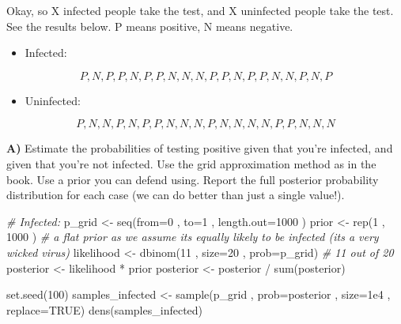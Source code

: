 \documentclass[
]{article}
\newenvironment{Shaded}{\begin{snugshade}}{\end{snugshade}}
\newcommand{\AttributeTok}[1]{\textcolor[rgb]{0.77,0.63,0.00}{#1}}
\newcommand{\CommentTok}[1]{\textcolor[rgb]{0.56,0.35,0.01}{\textit{#1}}}
\newcommand{\ConstantTok}[1]{\textcolor[rgb]{0.00,0.00,0.00}{#1}}
\newcommand{\DecValTok}[1]{\textcolor[rgb]{0.00,0.00,0.81}{#1}}
\newcommand{\FloatTok}[1]{\textcolor[rgb]{0.00,0.00,0.81}{#1}}
\newcommand{\FunctionTok}[1]{\textcolor[rgb]{0.00,0.00,0.00}{#1}}
\newcommand{\NormalTok}[1]{#1}
\newcommand{\OtherTok}[1]{\textcolor[rgb]{0.56,0.35,0.01}{#1}}
\newcommand{\SpecialCharTok}[1]{\textcolor[rgb]{0.00,0.00,0.00}{#1}}
\providecommand{\tightlist}{%
  \setlength{\itemsep}{0pt}\setlength{\parskip}{0pt}}
\begin{document}
Okay, so X infected people take the test, and X uninfected people take
the test. See the results below. P means positive, N means negative.

\begin{itemize}
\tightlist
\item
  Infected:
\end{itemize}

\[P, N, P, P, N, P, P, N, N, N, P, P, N, P, P, N, N, P, N, P\]

\begin{itemize}
\tightlist
\item
  Uninfected:
\end{itemize}

\[P, N, N, P, N, P, P, N, N, N, P, N, N, N, N, P, P, N, N, N\]

\textbf{A)} Estimate the probabilities of testing positive given that
you're infected, and given that you're not infected. Use the grid
approximation method as in the book. Use a prior you can defend using.
Report the full posterior probability distribution for each case (we can
do better than just a single value!).

\begin{Shaded}
\begin{Highlighting}[]
\CommentTok{\# Infected:}
\NormalTok{p\_grid }\OtherTok{\textless{}{-}} \FunctionTok{seq}\NormalTok{(}\AttributeTok{from=}\DecValTok{0}\NormalTok{ , }\AttributeTok{to=}\DecValTok{1}\NormalTok{ , }\AttributeTok{length.out=}\DecValTok{1000}\NormalTok{ )}
\NormalTok{prior }\OtherTok{\textless{}{-}} \FunctionTok{rep}\NormalTok{(}\DecValTok{1}\NormalTok{ , }\DecValTok{1000}\NormalTok{ ) }\CommentTok{\# a flat prior as we assume it\textquotesingle{}s equally likely to be infected (it\textquotesingle{}s a very wicked virus)}
\NormalTok{likelihood }\OtherTok{\textless{}{-}} \FunctionTok{dbinom}\NormalTok{(}\DecValTok{11}\NormalTok{ , }\AttributeTok{size=}\DecValTok{20}\NormalTok{ , }\AttributeTok{prob=}\NormalTok{p\_grid) }\CommentTok{\# 11 out of 20}
\NormalTok{posterior }\OtherTok{\textless{}{-}}\NormalTok{ likelihood }\SpecialCharTok{*}\NormalTok{ prior}
\NormalTok{posterior }\OtherTok{\textless{}{-}}\NormalTok{ posterior }\SpecialCharTok{/} \FunctionTok{sum}\NormalTok{(posterior)}

\FunctionTok{set.seed}\NormalTok{(}\DecValTok{100}\NormalTok{)}
\NormalTok{samples\_infected }\OtherTok{\textless{}{-}} \FunctionTok{sample}\NormalTok{(p\_grid , }\AttributeTok{prob=}\NormalTok{posterior , }\AttributeTok{size=}\FloatTok{1e4}\NormalTok{ , }\AttributeTok{replace=}\ConstantTok{TRUE}\NormalTok{)}
\FunctionTok{dens}\NormalTok{(samples\_infected)}
\end{Highlighting}
\end{Shaded}
\end{document}
